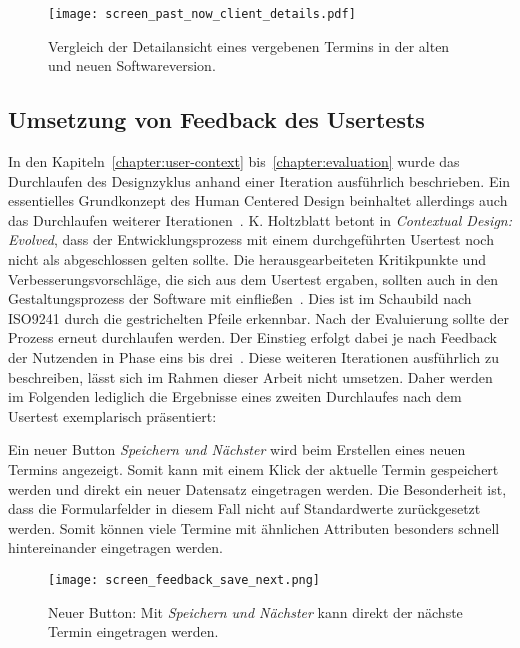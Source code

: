 \begin{figure}[H]
    \caption{Vergleich der Detailansicht eines vergebenen Termins in der alten und neuen Softwareversion.}
    \centering
    \texttt{[image: screen\_past\_now\_client\_details.pdf]}
\end{figure}

\subsection*{Umsetzung von Feedback des Usertests}
\label{paragraph:weitereIteration}

In den Kapiteln~\ref{chapter:user-context} bis~\ref{chapter:evaluation} wurde
das Durchlaufen des Designzyklus anhand einer Iteration ausführlich
beschrieben. Ein essentielles Grundkonzept des Human Centered Design beinhaltet
allerdings auch das Durchlaufen weiterer Iterationen~\cite{hcd}. K. Holtzblatt
betont in \textit{Contextual Design: Evolved}, dass der Entwicklungsprozess mit
einem durchgeführten Usertest noch nicht als abgeschlossen gelten sollte. Die
herausgearbeiteten Kritikpunkte und Verbesserungsvorschläge, die sich aus dem
Usertest ergaben, sollten auch in den Gestaltungsprozess der Software mit
einfließen~\cite{holtzblattCDEvolved}. Dies ist im Schaubild nach ISO9241 durch
die gestrichelten Pfeile erkennbar. Nach der Evaluierung sollte der Prozess
erneut durchlaufen werden. Der Einstieg erfolgt dabei je nach Feedback der
Nutzenden in Phase eins bis drei~\cite{ISO9241}. Diese weiteren Iterationen
ausführlich zu beschreiben, lässt sich im Rahmen dieser Arbeit nicht umsetzen.
Daher werden im Folgenden lediglich die Ergebnisse eines zweiten Durchlaufes
nach dem Usertest exemplarisch präsentiert:

Ein neuer Button \textit{Speichern und Nächster} wird beim Erstellen eines
neuen Termins angezeigt. Somit kann mit einem Klick der aktuelle Termin
gespeichert werden und direkt ein neuer Datensatz eingetragen werden. Die
Besonderheit ist, dass die Formularfelder in diesem Fall nicht auf
Standardwerte zurückgesetzt werden. Somit können viele Termine mit ähnlichen
Attributen besonders schnell hintereinander eingetragen werden.

\begin{figure}[H]
    \caption{Neuer Button: Mit \textit{Speichern und Nächster} kann direkt der nächste Termin eingetragen werden.}
    \centering
    \texttt{[image: screen\_feedback\_save\_next.png]}
\end{figure}

